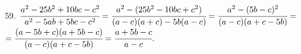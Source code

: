 59. $\cfrac{a^2-25b^2+10bc-c^2}{a^2-5ab+5bc-c^2}=\cfrac{a^2-(25b^2-10bc+c^2)}{(a-c)(a+c)-5b(a-c)}
=\cfrac{a^2-(5b-c)^2}{(a-c)(a+c-5b)}=$\\$=\cfrac{(a-5b+c)(a+5b-c)}{(a-c)(a+c-5b)}=\cfrac{a+5b-c}{a-c}.$\\
